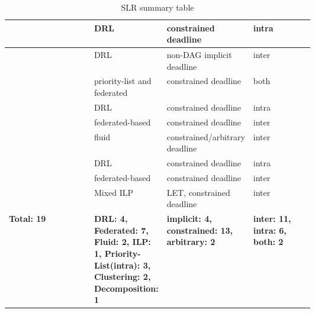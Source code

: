 \begin{table}
\begin{tabular}[]{|l|p{0.20\linewidth}|p{0.20\linewidth}|p{0.20\linewidth}|}
        \cite{Zhao2024GATDRLmodel} & DRL & constrained deadline & intra\\
        \hline
        \cite{Xu2023DRLtaskSched} & DRL & non-DAG implicit deadline & inter\\
        \hline
        \cite{Zhao2022DAGsched} & priority-list and federated & constrained deadline & both \\
        \hline
        \cite{Lee2021GlobalDagSchedDRL} & DRL & constrained deadline & intra\\
        \hline
        \cite{Jiang2023SchedVirtualProcs} & federated-based & constrained deadline & inter\\
        \hline
        \cite{GuanFluidDag2022} & fluid & constrained/arbitrary deadline & inter\\
        \hline
        \cite{GuanFRTDS2020RL} & DRL & constrained deadline & intra \\
        \hline
        \cite{JiangVirtuallyFederatedSched2021} & federated-based & constrained deadline & inter\\
        \hline
        \cite{Pazzaglia2021DMALETtransfer} & Mixed ILP & LET, constrained deadline & inter\\
        \hline
        \textbf{Total: 19} & \textbf{DRL: 4, Federated: 7, Fluid: 2, ILP: 1, Priority-List(intra): 3, Clustering: 2, Decomposition: 1}
        & \textbf{implicit: 4, constrained: 13, arbitrary: 2} & \textbf{inter: 11, intra: 6, both: 2} \\
        \hline
    \end{tabular}
    \caption{SLR summary table}
    \label{tab:slt_sum_table}
\end{table}



